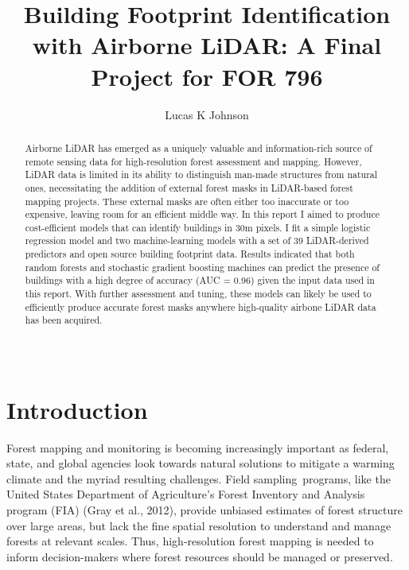 \documentclass[]{elsarticle} %
\begin{document}
\begin{frontmatter}

  \title{Building Footprint Identification with Airborne LiDAR: A Final Project for FOR 796}
    \author[]{Lucas K Johnson}
  
      
  \begin{abstract}
  Airborne LiDAR has emerged as a uniquely valuable and information-rich source
  of remote sensing data for high-resolution forest assessment and mapping.
  However, LiDAR data is limited in its ability to distinguish man-made
  structures from natural ones, necessitating the addition of external forest
  masks in LiDAR-based forest mapping projects.
  These external masks are often either too inaccurate or too expensive,
  leaving room for an efficient middle way.
  In this report I aimed to produce cost-efficient models that can identify
  buildings in 30m pixels.
  I fit a simple logistic regression model and two machine-learning
  models with a set of 39 LiDAR-derived predictors and open source building
  footprint data.
  Results indicated that both random forests and stochastic gradient boosting
  machines can predict the presence of buildings with a high degree of accuracy
  (AUC = 0.96) given the input data used in this report.
  With further assessment and tuning, these models can likely be used to
  efficiently produce accurate forest masks anywhere high-quality airbone LiDAR
  data has been acquired.

  \,
  \end{abstract}
  
 \end{frontmatter}

\hypertarget{introduction}{%
\section{Introduction}\label{introduction}}

Forest mapping and monitoring is becoming increasingly important as
federal, state, and global agencies look towards natural solutions
to mitigate a warming climate and the myriad resulting challenges.
Field sampling~programs,
like the United States Department of Agriculture's Forest Inventory and Analysis
program (FIA) (Gray et al., 2012),
provide unbiased estimates of forest structure over large areas,
but lack the fine spatial resolution to understand and manage forests at
relevant scales.
Thus, high-resolution forest mapping is needed to inform decision-makers where
forest resources should be managed or preserved.
\end{document}
